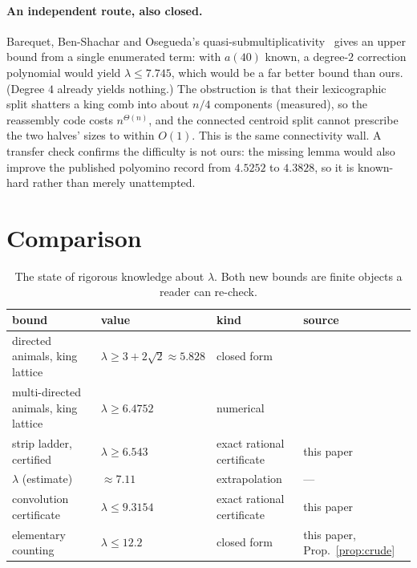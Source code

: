 \documentclass[11pt]{article}
\begin{document}
\paragraph{An independent route, also closed.} Barequet, Ben-Shachar and
Osegueda's quasi-submultiplicativity~\cite{bbo2021} gives an upper bound from a
single enumerated term: with $a(40)$ known, a degree-$2$ correction polynomial
would yield $\lambda \le 7.745$, which would be a far better bound than ours.
(Degree $4$ already yields nothing.) The obstruction is that their lexicographic
split shatters a king comb into about $n/4$ components (measured), so the
reassembly code costs $n^{\Theta(n)}$, and the connected centroid split cannot
prescribe the two halves' sizes to within $O(1)$. This is the same connectivity
wall. A transfer check confirms the difficulty is not ours: the missing lemma
would also improve the published polyomino record from $4.5252$ to $4.3828$, so
it is known-hard rather than merely unattempted.

\section{Comparison}

\begin{table}[H]
\centering\small\setlength{\tabcolsep}{4pt}
\begin{tabular}{l l l l}
\toprule
bound & value & kind & source \\
\midrule
directed animals, king lattice & $\lambda \ge 3+2\sqrt2 \approx 5.828$ & closed form & \cite{bacher2015} \\
multi-directed animals, king lattice & $\lambda \ge 6.4752$ & numerical & \cite{bacher2015} \\
strip ladder, certified & $\lambda \ge \mathbf{6.543}$ & exact rational certificate & this paper \\
$\lambda$ (estimate) & $\approx 7.11$ & extrapolation & --- \\
convolution certificate & $\lambda \le \mathbf{9.3154}$ & exact rational certificate & this paper \\
elementary counting & $\lambda \le 12.2$ & closed form & this paper, Prop.~\ref{prop:crude} \\
\bottomrule
\end{tabular}
\caption{The state of rigorous knowledge about $\lambda$. Both new bounds are
finite objects a reader can re-check.}
\label{tab:compare}
\end{table}
\end{document}
